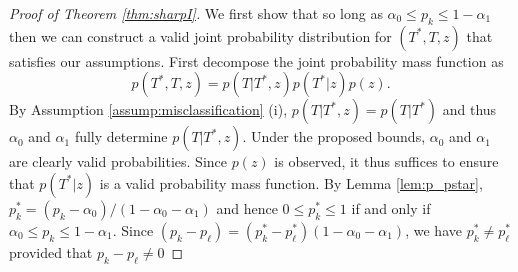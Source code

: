\begin{proof}[Proof of Theorem \ref{thm:sharpI}]
We first show that so long as $\alpha_0 \leq p_k \leq 1 - \alpha_1$ then we can construct a valid joint probability distribution for $(T^*, T, z)$ that satisfies our assumptions.
First decompose the joint probability mass function as
\[
  p(T^*,T,z) = p(T|T^*,z)p(T^*|z)p(z).
\]
By Assumption \ref{assump:misclassification} (i), $p(T|T^*,z) = p(T|T^*)$ and thus $\alpha_0$ and $\alpha_1$ fully determine $p(T|T^*,z)$.  
Under the proposed bounds, $\alpha_0$ and $\alpha_1$ are clearly valid probabilities.
Since $p(z)$ is observed, it thus suffices to ensure that $p(T^*|z)$ is a valid probability mass function.
By Lemma \ref{lem:p_pstar}, $p_k^* = (p_k - \alpha_0) / (1 - \alpha_0 - \alpha_1)$ and hence $0 \leq p_k^* \leq 1$ if and only if $\alpha_0 \leq p_k \leq 1 - \alpha_1$.
Since $(p_k - p_\ell) = (p_k^* - p_\ell^*)(1 - \alpha_0 - \alpha_1)$, we have $p^*_k \neq p^*_\ell$ provided that $p_k - p_\ell \neq 0$ 


\end{proof}
